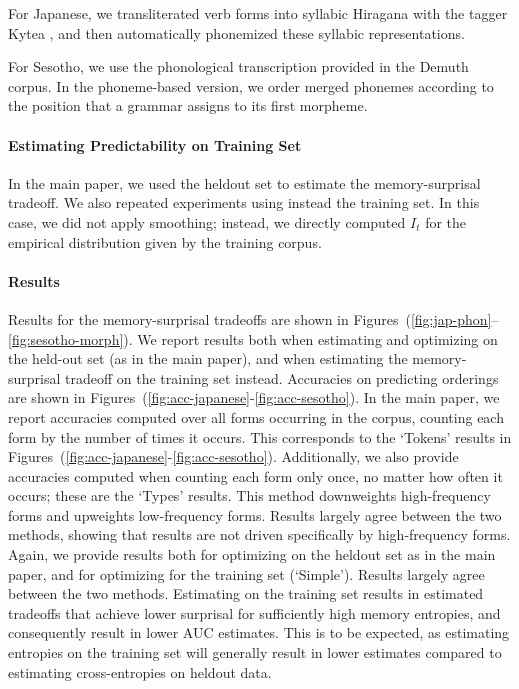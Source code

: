 \documentclass[11pt,letterpaper]{article}
\begin{document}
For Japanese, we transliterated verb forms into syllabic Hiragana with the tagger Kytea \citep{DBLP:conf/lrec/NeubigM10,DBLP:conf/acl/NeubigNM11}, and then automatically phonemized these syllabic representations.


For Sesotho, we use the phonological transcription provided in the Demuth corpus.
In the phoneme-based version, we order merged phonemes according to the position that a grammar assigns to its first morpheme.

\paragraph{Estimating Predictability on Training Set}
In the main paper, we used the heldout set to estimate the memory-surprisal tradeoff.
We also repeated experiments using instead the training set.
In this case, we did not apply smoothing; instead, we directly computed $I_t$ for the empirical distribution given by the training corpus.

\paragraph{Results}
Results for the memory-surprisal tradeoffs are shown in Figures~(\ref{fig:jap-phon}--\ref{fig:sesotho-morph}).
We report results both when estimating and optimizing on the held-out set (as in the main paper), and when estimating the memory-surprisal tradeoff on the training set instead.
Accuracies on predicting orderings are shown in Figures~(\ref{fig:acc-japanese}-\ref{fig:acc-sesotho}).
In the main paper, we report accuracies computed over all forms occurring in the corpus, counting each form by the number of times it occurs. This corresponds to the `Tokens' results in Figures~(\ref{fig:acc-japanese}-\ref{fig:acc-sesotho}).
Additionally, we also provide accuracies computed when counting each form only once, no matter how often it occurs; these are the `Types' results. This method downweights high-frequency forms and upweights low-frequency forms.
Results largely agree between the two methods, showing that results are not driven specifically by high-frequency forms.
Again, we provide results both for optimizing on the heldout set as in the main paper, and for optimizing for the training set (`Simple').
Results largely agree between the two methods.
Estimating on the training set results in estimated tradeoffs that achieve lower surprisal for sufficiently high memory entropies, and consequently result in lower AUC estimates. This is to be expected, as estimating entropies on the training set will generally result in  lower estimates compared to estimating cross-entropies on heldout data.
\end{document}
